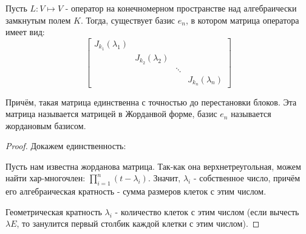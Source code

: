 \begin{theorem} \thmslashn

    Пусть $L : V \mapsto V$ - оператор на конечномерном пространстве над алгебраически замкнутым полем $K$. Тогда, существует базис $e_{n}$, в котором матрица оператора имеет вид:
    \begin{equation*}
        \begin{bmatrix} 
            J_{k_1}(\lambda_1) & &\\
                               & J_{k_2}(\lambda_2) &\\
                               & & \ddots &\\
                               & & & J_{k_{n}}(\lambda_{n})
        \end{bmatrix} 
    \end{equation*}

    Причём, такая матрица единственна с точностью до перестановки блоков. Эта матрица называется матрицей в Жорданвой форме, базис $e_{n}$ называется жордановым базисом.
    \begin{proof} \thmslashn
    
       Докажем единственность:

       Пусть нам известна жорданова матрица. Так-как она верхнетреугольная, можем найти хар-многочлен: $\prod\limits_{i=1}^{n} (t-\lambda_{i}) $. Значит, $\lambda_{i}$ - собственное число, причём его алгебраическая кратность - сумма размеров клеток с этим числом.

       Геометрическая кратность $\lambda_{i}$ - количество клеток с этим числом (если вычесть $\lambda E$, то занулится первый столбик каждой клетки с этим числом).

    \end{proof}
\end{theorem}
